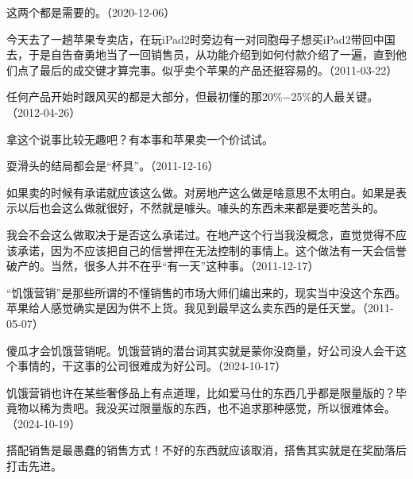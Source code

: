 这两个都是需要的。（2020-12-06）

今天去了一趟苹果专卖店，在玩iPad2时旁边有一对同胞母子想买iPad2带回中国去，于是自告奋勇地当了一回销售员，从功能介绍到如何付款介绍了一遍，直到他们点了最后的成交键才算完事。似乎卖个苹果的产品还挺容易的。（2011-03-22）


任何产品开始时跟风买的都是大部分，但最初懂的那20\%\( - \)25\%的人最关键。（2012-04-26）



拿这个说事比较无趣吧？有本事和苹果卖一个价试试。

耍滑头的结局都会是“杯具”。（2011-12-16）


如果卖的时候有承诺就应该这么做。对房地产这么做是啥意思不太明白。如果是表示以后也会这么做就很好，不然就是噱头。噱头的东西未来都是要吃苦头的。


我会不会这么做取决于是否这么承诺过。在地产这个行当我没概念，直觉觉得不应该承诺，因为不应该把自己的信誉押在无法控制的事情上。这个做法有一天会信誉破产的。当然，很多人并不在乎“有一天”这种事。（2011-12-17）


“饥饿营销”是那些所谓的不懂销售的市场大师们编出来的，现实当中没这个东西。苹果给人感觉确实是因为供不上货。我见到最早这么卖东西的是任天堂。（2011-05-07）

傻瓜才会饥饿营销呢。饥饿营销的潜台词其实就是蒙你没商量，好公司没人会干这个事情的，干这事的公司很难成为好公司。（2024-10-17）

饥饿营销也许在某些奢侈品上有点道理，比如爱马仕的东西几乎都是限量版的？毕竟物以稀为贵吧。我没买过限量版的东西，也不追求那种感觉，所以很难体会。（2024-10-19）


搭配销售是最愚蠢的销售方式！不好的东西就应该取消，搭售其实就是在奖励落后打击先进。

